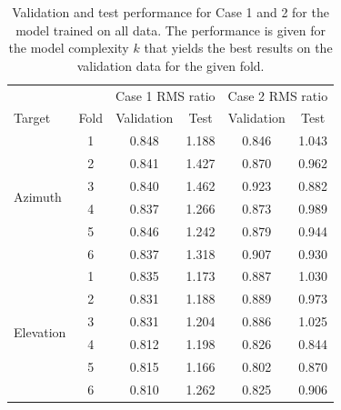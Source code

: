 \begin{table}[!htbp]
    \centering
    \caption{Validation and test performance for Case 1 and 2 for the model trained on all data.
    The performance is given for the model complexity $k$ that yields the best results on the validation data for the given fold.}
    \begin{tabular}{lccccc}
        \toprule
        & & \multicolumn{2}{c}{Case 1 RMS ratio} & \multicolumn{2}{c}{Case 2 RMS ratio} \\
        \cmidrule{3-4} \cmidrule{5-6}
        Target & Fold & Validation & Test &  Validation &  Test \\
        \midrule
        \multirow{6}{*}{Azimuth} & 1 &  0.848 &       1.188 &      0.846 &       1.043 \\
                            & 2 &  0.841 &       1.427 &      0.870 &       0.962 \\
                            & 3 &  0.840 &       1.462 &      0.923 &       0.882 \\
                            & 4 &  0.837 &       1.266 &      0.873 &       0.989 \\
                            & 5 &  0.846 &       1.242 &      0.879 &       0.944 \\
                            & 6 &  0.837 &       1.318 &      0.907 &       0.930 \\
        \hline
        \multirow{6}{*}{Elevation} & 1 &  0.835 &       1.173 &      0.887 &       1.030 \\
                            & 2 &  0.831 &       1.188 &      0.889 &       0.973 \\
                            & 3 &  0.831 &       1.204 &      0.886 &       1.025 \\
                            & 4 &  0.812 &       1.198 &      0.826 &       0.844 \\
                            & 5 &  0.815 &       1.166 &      0.802 &       0.870 \\
                            & 6 &  0.810 &       1.262 &      0.825 &       0.906 \\
        \bottomrule
    \end{tabular}
    \label{tab:results_minval_val_test_days_04_n230}
\end{table}


